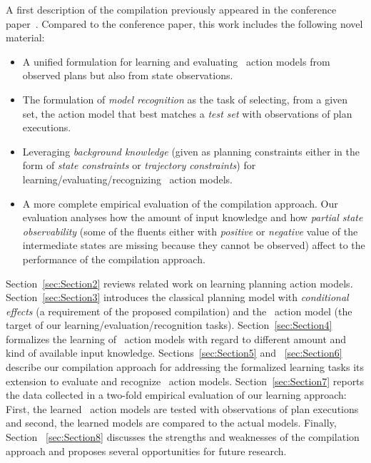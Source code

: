 A first description of the compilation previously appeared in the conference paper~\cite{aineto2018learning}. Compared to the conference paper, this work includes the following novel material:
\begin{itemize}
\item A unified formulation for learning and evaluating \strips\ action models from observed plans but also from state observations.
\item The formulation of {\em model recognition} as the task of selecting, from a given set, the action model that best matches a {\em test set} with observations of plan executions.
\item Leveraging {\em background knowledge} (given as planning constraints either in the form of {\em state constraints} or {\em trajectory constraints}) for learning/evaluating/recognizing \strips\ action models.
\item A more complete empirical evaluation of the compilation approach. Our evaluation analyses how the amount of input knowledge and how {\em partial state observability} (some of the fluents either with {\em positive} or {\em negative} value of the intermediate states are missing because they cannot be observed) affect to the performance of the compilation approach.
\end{itemize}

Section~\ref{sec:Section2} reviews related work on learning planning action models. Section~\ref{sec:Section3} introduces the classical planning model with {\em conditional effects} (a requirement of the proposed compilation) and the \strips\ action model (the target of our learning/evaluation/recognition tasks). Section~\ref{sec:Section4} formalizes the learning of \strips\ action models with regard to different amount and kind of available input knowledge. Sections~\ref{sec:Section5} and ~\ref{sec:Section6} describe our compilation approach for addressing the formalized learning tasks its extension to evaluate and recognize \strips\ action models. Section~\ref{sec:Section7} reports the data collected in a two-fold empirical evaluation of our learning approach: First, the learned \strips\ action models are tested with observations of plan executions and second, the learned models are compared to the actual models. Finally, Section ~\ref{sec:Section8} discusses the strengths and weaknesses of the compilation approach and proposes several opportunities for future research.

 